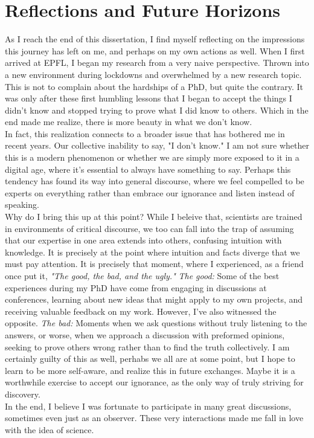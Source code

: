 \cleardoublepage
\chapter*{Reflections and Future Horizons}

As I reach the end of this dissertation, I find myself reflecting on the impressions this journey has left on me, and perhaps on my own actions as well.
When I first arrived at EPFL, I began my research from a very naive perspective.
Thrown into a new environment during lockdowns and overwhelmed by a new research topic.
This is not to complain about the hardships of a PhD, but quite the contrary.
It was only after these first humbling lessons that I began to accept the things I didn’t know and stopped trying to prove what I did know to others.
Which in the end made me realize, there is more beauty in what we don't know.\\
In fact, this realization connects to a broader issue that has bothered me in recent years.
Our collective inability to say, "I don't know."
I am not sure whether this is a modern phenomenon or whether we are simply more exposed to it in a digital age, where it's essential to always have something to say.
Perhaps this tendency has found its way into general discourse, where we feel compelled to be experts on everything rather than embrace our ignorance and listen instead of speaking.\\

Why do I bring this up at this point?
While I beleive that, scientists are trained in environments of critical discourse, we too can fall into the trap of assuming that our expertise in one area extends into others, confusing intuition with knowledge.
It is precisely at the point where intuition and facts diverge that we must pay attention.
It is precisely that moment, where I experienced, as a friend once put it, \textit{"The good, the bad, and the ugly."}
\textit{The good:} Some of the best experiences during my PhD have come from engaging in discussions at conferences, learning about new ideas that might apply to my own projects, and receiving valuable feedback on my work.
However, I’ve also witnessed the opposite.
\textit{The bad:} Moments when we ask questions without truly listening to the answers, or worse, when we approach a discussion with preformed opinions, seeking to prove others wrong rather than to find the truth collectively.
I am certainly guilty of this as well, perhabs we all are at some point, but I hope to learn to be more self-aware, and realize this in future exchanges.
Maybe it is a worthwhile exercise to accept our ignorance, as the only way of truly striving for discovery.\\
In the end, I believe I was fortunate to participate in many great discussions, sometimes even just as an observer.
These very interactions made me fall in love with the idea of science.\hfill\break

